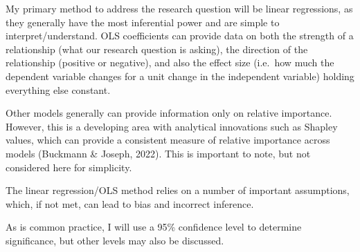 \documentclass[
  number]{elsarticle}
\begin{document}
My primary method to address the research question will be linear
regressions, as they generally have the most inferential power and are
simple to interpret/understand. OLS coefficients can provide data on
both the strength of a relationship (what our research question is
asking), the direction of the relationship (positive or negative), and
also the effect size (i.e.~how much the dependent variable changes for a
unit change in the independent variable) holding everything else
constant.

Other models generally can provide information only on relative
importance. However, this is a developing area with analytical
innovations such as Shapley values, which can provide a consistent
measure of relative importance across models (Buckmann \& Joseph, 2022).
This is important to note, but not considered here for simplicity.

The linear regression/OLS method relies on a number of important
assumptions, which, if not met, can lead to bias and incorrect
inference.

As is common practice, I will use a 95\% confidence level to determine
significance, but other levels may also be discussed.
\end{document}
